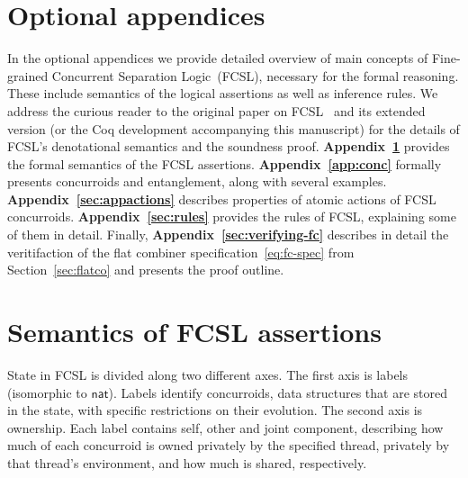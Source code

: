 
\setlength{\parindent}{0.0in}
\setlength{\parskip}{5pt}


\section*{Optional appendices}

In the optional appendices we provide detailed overview of main
concepts of Fine-grained Concurrent Separation Logic~(FCSL), necessary
for the formal reasoning. These include semantics of the logical
assertions as well as inference rules. We address the curious reader
to the original paper on FCSL~\cite{Nanevski-al:ESOP14} and its
extended version (or the Coq development accompanying this manuscript)
for the details of FCSL's denotational semantics and the soundness
proof.
%
\textbf{Appendix~\ref{sec:broccoli}} provides the formal semantics of
the FCSL assertions.
%
\textbf{Appendix~\ref{app:conc}} formally presents concurroids and
entanglement, along with several examples.
%
\textbf{Appendix~\ref{sec:appactions}} describes properties of
atomic actions of FCSL concurroids.
%
\textbf{Appendix~\ref{sec:rules}} provides the rules of FCSL,
explaining some of them in detail.
%
Finally, \textbf{Appendix~\ref{sec:verifying-fc}} describes in detail
the veritifaction of the flat combiner specification~\eqref{eq:fc-spec}
from Section~\ref{sec:flatco} and presents the proof outline.

\section{Semantics of FCSL assertions}
\label{sec:broccoli}

State in FCSL is divided along two different axes. The first axis is
labels (isomorphic to $\mathsf{nat}$). Labels identify concurroids,
\ie data structures that are stored in the state, with specific
restrictions on their evolution. The second axis is ownership. Each
label contains self, other and joint component, describing how much of
each concurroid is owned privately by the specified thread, privately
by that thread's environment, and how much is shared, respectively.

